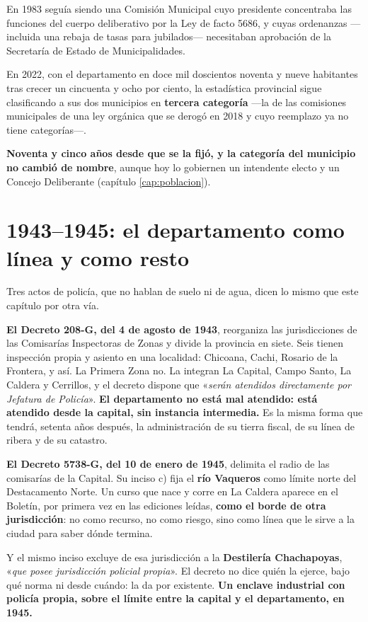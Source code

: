 En 1983 seguía siendo una Comisión Municipal cuyo presidente concentraba las funciones del
cuerpo deliberativo por la Ley de facto 5686, y cuyas ordenanzas —incluida una rebaja de
tasas para jubilados— necesitaban aprobación de la Secretaría de Estado de Municipalidades.

En 2022, con el departamento en doce mil doscientos noventa y nueve habitantes tras crecer un cincuenta y ocho por ciento, la estadística provincial sigue clasificando a sus dos municipios en \textbf{tercera categoría} ---la de las comisiones municipales de una ley orgánica
que se derogó en 2018 y cuyo reemplazo ya no tiene categorías---.

\textbf{Noventa y cinco años desde que se la fijó, y la categoría del municipio no cambió de nombre}, aunque hoy lo gobiernen un intendente electo y un Concejo Deliberante (capítulo \ref{cap:poblacion}).

\section{1943--1945: el departamento como línea y como resto}

Tres actos de policía, que no hablan de suelo ni de agua, dicen lo mismo que este capítulo por
otra vía.

\textbf{El Decreto 208-G, del 4 de agosto de 1943}, reorganiza las jurisdicciones de las
Comisarías Inspectoras de Zonas y divide la provincia en siete. Seis tienen inspección propia y
asiento en una localidad: Chicoana, Cachi, Rosario de la Frontera, y así. La Primera Zona no.
La integran La Capital, Campo Santo, La Caldera y Cerrillos, y el decreto dispone que «\textit{serán
atendidos directamente por Jefatura de Policía}». \textbf{El departamento no está mal atendido:
está atendido desde la capital, sin instancia intermedia.} Es la misma forma que tendrá,
setenta años después, la administración de su tierra fiscal, de su línea de ribera y de su
catastro.

\textbf{El Decreto 5738-G, del 10 de enero de 1945}, delimita el radio de las comisarías de la
Capital. Su inciso c) fija el \textbf{río Vaqueros} como límite norte del Destacamento Norte.
Un curso que nace y corre en La Caldera aparece en el Boletín, por primera vez en las ediciones leídas,
\textbf{como el borde de otra jurisdicción}: no como recurso, no como riesgo, sino como línea
que le sirve a la ciudad para saber dónde termina.

Y el mismo inciso excluye de esa jurisdicción a la \textbf{Destilería Chachapoyas}, «\textit{que
posee jurisdicción policial propia}». El decreto no dice quién la ejerce, bajo qué norma ni
desde cuándo: la da por existente. \textbf{Un enclave industrial con policía propia, sobre el
límite entre la capital y el departamento, en 1945.}

